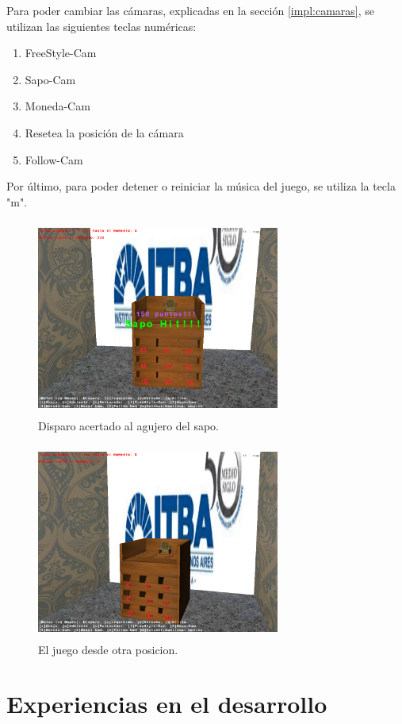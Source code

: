 \documentclass{acm_proc_article-sp}
\begin{document}
Para poder cambiar las c\'amaras, explicadas en la secci\'on \ref{impl:camaras}, se utilizan las siguientes teclas num\'ericas:
\begin{enumerate}
 \item FreeStyle-Cam
 \item Sapo-Cam
 \item Moneda-Cam 
 \item Resetea la posici\'on de la c\'amara
 \item Follow-Cam 
\end{enumerate}

Por \'ultimo, para poder detener o reiniciar la m\'usica del juego, se utiliza la tecla "m". 

\begin{figure}[!ht]
	\centering
		\includegraphics[width=8cm,height=6.45cm]{img/sapoShoot.png}
	\caption{Disparo acertado al agujero del sapo.}
	\label{fig:sapoHit}
\end{figure}


\begin{figure}[!ht]
	\centering
		\includegraphics[width=8cm,height=6.45cm]{img/perspSapo.png}
	\caption{El juego desde otra posicion.}
	\label{fig:farSapo}
\end{figure}

\section{Experiencias en el desarrollo}
\end{document}
